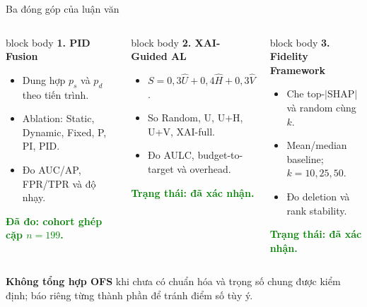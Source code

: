\documentclass[aspectratio=169,10pt]{beamer}
\newcommand{\good}[1]{\textcolor{green}{\textbf{#1}}}
\newcommand{\smallbullet}{\setlength{\itemsep}{0.15em}\setlength{\parskip}{0pt}}
\newenvironment{bluebox}[1]{%
  \begin{beamercolorbox}[rounded=true,shadow=true,sep=0.18cm]{block body}%
  {\color{uetblue}\textbf{#1}}\par\vspace{0.08cm}\color{ink}%
}{\end{beamercolorbox}}
\begin{document}
\begin{frame}[t,shrink=5]{Ba đóng góp của luận văn}
\begin{columns}[T,onlytextwidth]
\begin{bluebox}{1. PID Fusion}
\small
\begin{itemize}\smallbullet
  \item Dung hợp $p_s$ và $p_d$ theo tiến trình.
  \item Ablation: Static, Dynamic, Fixed, P, PI, PID.
  \item Đo AUC/AP, FPR/TPR và độ nhạy.
\end{itemize}
\good{Đã đo: cohort ghép cặp $n=199$.}
\end{bluebox}

\begin{bluebox}{2. XAI-Guided AL}
\small
\begin{itemize}\smallbullet
  \item $S=0{,}3\hat U+0{,}4\hat H+0{,}3\hat V$.
  \item So Random, U, U+H, U+V, XAI-full.
  \item Đo AULC, budget-to-target và overhead.
\end{itemize}
\good{Trạng thái: đã xác nhận.}
\end{bluebox}

\begin{bluebox}{3. Fidelity Framework}
\small
\begin{itemize}\smallbullet
  \item Che top-$|$SHAP$|$ và random cùng $k$.
  \item Mean/median baseline; $k=10,25,50$.
  \item Đo deletion và rank stability.
\end{itemize}
\good{Trạng thái: đã xác nhận.}
\end{bluebox}
\end{columns}

\vspace{0.40cm}
\centering\small
\textbf{Không tổng hợp OFS} khi chưa có chuẩn hóa và trọng số chung được kiểm định; báo riêng từng thành phần để tránh điểm số tùy ý.
\end{frame}
\end{document}
